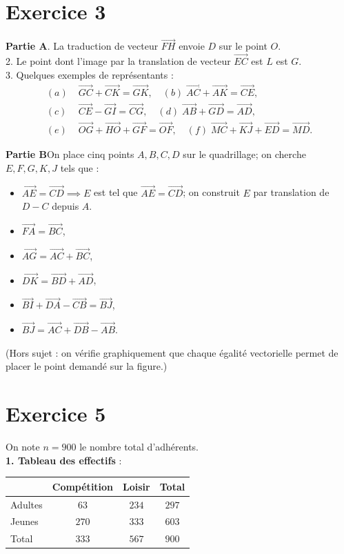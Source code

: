 \documentclass[12pt,a4paper]{article}
\begin{document}
\section*{Exercice 3}
\textbf{Partie A}. La traduction de vecteur $\overrightarrow{FH}$ envoie $D$ sur le point $O$.\\
2. Le point dont l'image par la translation de vecteur $\overrightarrow{EC}$ est $L$ est $G$.\\
3. Quelques exemples de représentants :
\begin{align*}
(a)\;&\overrightarrow{GC}+\overrightarrow{CK}=\overrightarrow{GK},\quad
(b)\;\overrightarrow{AC}+\overrightarrow{AK}=\overrightarrow{CE},\\
(c)\;&\overrightarrow{CE}-\overrightarrow{GI}=\overrightarrow{CG},\quad
(d)\;\overrightarrow{AB}+\overrightarrow{GD}=\overrightarrow{AD},\\
(e)\;&\overrightarrow{OG}+\overrightarrow{HO}+\overrightarrow{GF}=\overrightarrow{OF},\quad
(f)\;\overrightarrow{MC}+\overrightarrow{KJ}+\overrightarrow{ED}=\overrightarrow{MD}.
\end{align*}

\textbf{Partie B}\quad On place cinq points $A,B,C,D$ sur le quadrillage; on cherche $E,F,G,K,J$ tels que :
\begin{itemize}
  \item $\overrightarrow{AE}=\overrightarrow{CD}\implies E$ est tel que $\vec{AE}=\vec{CD}$; on construit $E$ par translation de $D-C$ depuis $A$.
  \item $\overrightarrow{FA}=\overrightarrow{BC}$,
  \item $\overrightarrow{AG}=\overrightarrow{AC}+\overrightarrow{BC}$,
  \item $\overrightarrow{DK}=\overrightarrow{BD}+\overrightarrow{AD}$,
  \item $\overrightarrow{BI}+\overrightarrow{DA}-\overrightarrow{CB}=\overrightarrow{BJ}$,
  \item $\overrightarrow{BJ}=\overrightarrow{AC}+\overrightarrow{DB}-\overrightarrow{AB}.$
\end{itemize}
(Hors sujet : on vérifie graphiquement que chaque égalité vectorielle permet de placer le point demandé sur la figure.)

\section*{Exercice 5}
On note $n=900$ le nombre total d’adhérents.\\
\textbf{1. Tableau des effectifs} :
\begin{center}
\begin{tabular}{l|cc|c}
               & Compétition & Loisir & Total \\
\hline
Adultes        & $63$        & $234$  & $297$ \\
Jeunes         & $270$       & $333$  & $603$ \\
\hline
Total          & $333$       & $567$  & $900$ 
\end{tabular}
\end{center}
\end{document}
